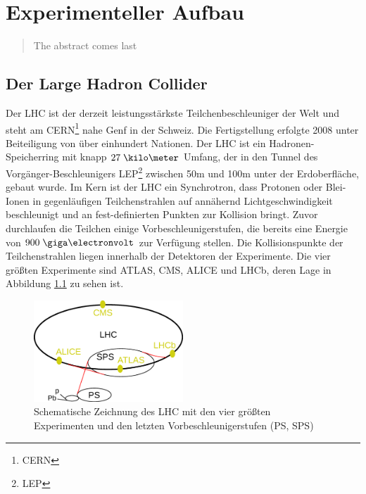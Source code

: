 
\chapter{Experimenteller Aufbau}
\label{experimenteller_aufbau}

\begin{quote}
    The abstract comes last
\end{quote}

%
\section{Der Large Hadron Collider}
\label{lhc}

Der \acf{LHC} ist der derzeit leistungsstärkste Teilchenbeschleuniger der Welt
und steht am CERN\footnote{\acf{CERN}} nahe Genf in der Schweiz. Die
Fertigstellung erfolgte 2008 unter Beiteiligung von über einhundert Nationen.
Der \ac{LHC} ist ein Hadronen-Speicherring mit knapp $27\;\kilo\meter$ Umfang,
der in den Tunnel des Vorgänger-Beschleunigers LEP\footnote{\acf{LEP}} zwischen
50m und 100m unter der Erdoberfläche, gebaut wurde. Im Kern ist der
\ac{LHC} ein Synchrotron, dass Protonen oder Blei-Ionen in gegenläufigen
Teilchenstrahlen auf annähernd Lichtgeschwindigkeit beschleunigt und an
fest-definierten Punkten zur Kollision bringt. Zuvor durchlaufen die Teilchen
einige Vorbeschleunigerstufen, die bereits eine Energie von $900\GeV$ zur
Verfügung stellen.  Die Kollisionspunkte der Teilchenstrahlen liegen innerhalb
der Detektoren der Experimente. Die vier größten Experimente sind \acs{ATLAS},
CMS, ALICE und LHCb, deren Lage in Abbildung \ref{fig:LHC} zu sehen ist.

\begin{figure}[h]
    \centering
    \includegraphics[width=0.5\textwidth]{img/LHC}
    \caption[Zeichnung des LHC mit Vorbeschleunigern und Experimenten]
        {Schematische Zeichnung des LHC mit den vier größten Experimenten und
        den letzten Vorbeschleunigerstufen (PS, SPS)}
    \label{fig:LHC}
\end{figure}

